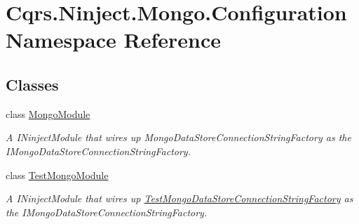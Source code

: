 \hypertarget{namespaceCqrs_1_1Ninject_1_1Mongo_1_1Configuration}{}\section{Cqrs.\+Ninject.\+Mongo.\+Configuration Namespace Reference}
\label{namespaceCqrs_1_1Ninject_1_1Mongo_1_1Configuration}
\subsection*{Classes}
\begin{DoxyCompactItemize}
\item 
class \hyperlink{classCqrs_1_1Ninject_1_1Mongo_1_1Configuration_1_1MongoModule}{Mongo\+Module}
\begin{DoxyCompactList}\small\item\em A I\+Ninject\+Module that wires up Mongo\+Data\+Store\+Connection\+String\+Factory as the I\+Mongo\+Data\+Store\+Connection\+String\+Factory. \end{DoxyCompactList}\item 
class \hyperlink{classCqrs_1_1Ninject_1_1Mongo_1_1Configuration_1_1TestMongoModule}{Test\+Mongo\+Module}
\begin{DoxyCompactList}\small\item\em A I\+Ninject\+Module that wires up \hyperlink{classCqrs_1_1Ninject_1_1Mongo_1_1TestMongoDataStoreConnectionStringFactory}{Test\+Mongo\+Data\+Store\+Connection\+String\+Factory} as the I\+Mongo\+Data\+Store\+Connection\+String\+Factory. \end{DoxyCompactList}\end{DoxyCompactItemize}

